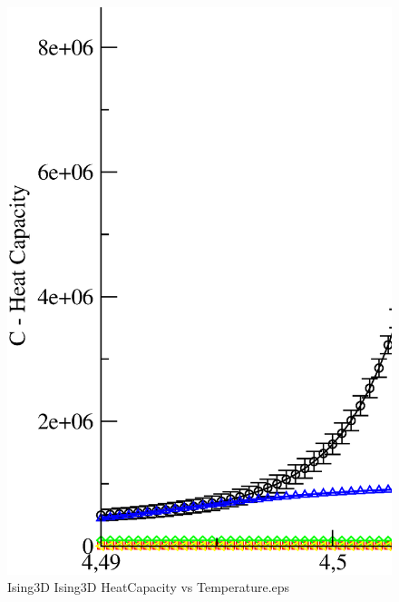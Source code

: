 \begin{figure}[!htpb]
  \centering
  \includegraphics[width=\textwidth]{./plots/Ising3D/Ising3D_HeatCapacity_vs_Temperature.eps}
  \caption{Ising3D Ising3D HeatCapacity vs Temperature.eps}
\end{figure}

